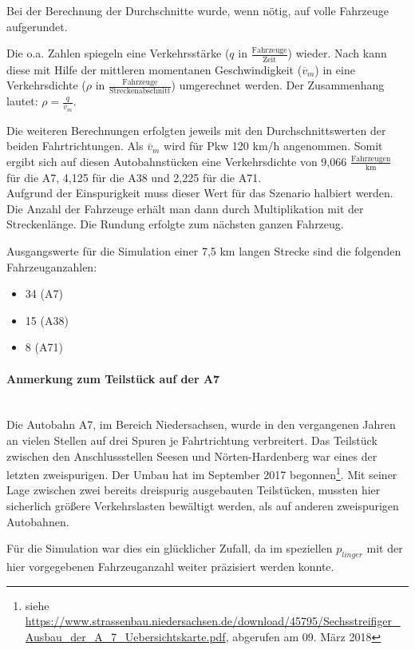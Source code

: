 \noindent
Bei der Berechnung der Durchschnitte wurde, wenn nötig, auf volle Fahrzeuge aufgerundet.

Die o.a. Zahlen spiegeln eine Verkehrsstärke ($q$ in $ \frac{\text{Fahrzeuge}}{\text{Zeit}} $) wieder.
Nach \cite{verkehrsplanung} kann diese mit Hilfe der mittleren momentanen Geschwindigkeit ($\overline{v}_{m}$) in eine Verkehrsdichte ($\rho$ in $ \frac{\text{Fahrzeuge}}{\text{Streckenabschnitt}} $) umgerechnet werden.
Der Zusammenhang lautet: $ \rho = \frac{q}{\overline{v}_{m}} $.

Die weiteren Berechnungen erfolgten jeweils mit den Durchschnittswerten der beiden Fahrtrichtungen.
Als $\overline{v}_{m}$ wird für Pkw 120 km/h angenommen.
Somit ergibt sich auf diesen Autobahnstücken eine Verkehrsdichte von 9,066 $\frac{\text{Fahrzeugen}}{\text{km}}$ für die A7, 4,125 für die A38 und 2,225 für die A71.
\\
Aufgrund der Einspurigkeit muss dieser Wert für das Szenario halbiert werden. 
Die Anzahl der Fahrzeuge erhält man dann durch Multiplikation mit der Streckenlänge.
Die Rundung erfolgte zum nächsten ganzen Fahrzeug.

Ausgangswerte für die Simulation einer 7,5 km langen Strecke sind die folgenden Fahrzeuganzahlen: 
\begin{itemize}
	\itemsep0em
	\item 34 (A7)
	\item 15 (A38)
	\item 8 (A71)
\end{itemize}

\paragraph*{Anmerkung zum Teilstück auf der A7}
\hfill \\
Die Autobahn A7, im Bereich Niedersachsen, wurde in den vergangenen Jahren an vielen Stellen auf drei Spuren je Fahrtrichtung verbreitert.
Das Teilstück zwischen den Anschlussstellen Seesen und Nörten-Hardenberg war eines der letzten zweispurigen.
Der Umbau hat im September 2017 begonnen\footnote{siehe \url{https://www.strassenbau.niedersachsen.de/download/45795/Sechsstreifiger_Ausbau_der_A_7_Uebersichtskarte.pdf}, abgerufen am 09. März 2018}.
Mit seiner Lage zwischen zwei bereits dreispurig ausgebauten Teilstücken, mussten hier sicherlich größere Verkehrslasten bewältigt werden, als auf anderen zweispurigen Autobahnen.

Für die Simulation war dies ein glücklicher Zufall, da im speziellen $p_{linger}$ mit der hier vorgegebenen Fahrzeuganzahl weiter präzisiert werden konnte.




